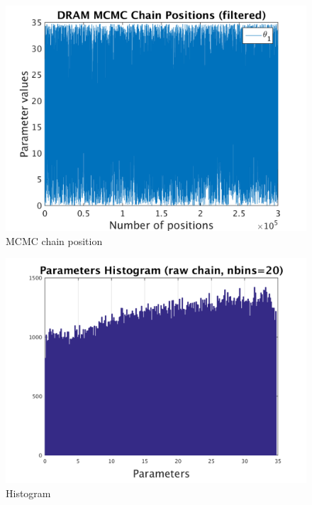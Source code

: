 \begin{figure}[h!]
  
  \centering
   \includegraphics[scale=0.75]{output_300000/simple_ip_chain_pos_filt}
   \caption{MCMC chain position }
\end{figure}


\begin{figure}[h!]
  
  \centering
   \includegraphics[scale=0.75]{output_300000/simple_ip_hist_raw}
   \caption{Histogram}
\end{figure}

\clearpage

